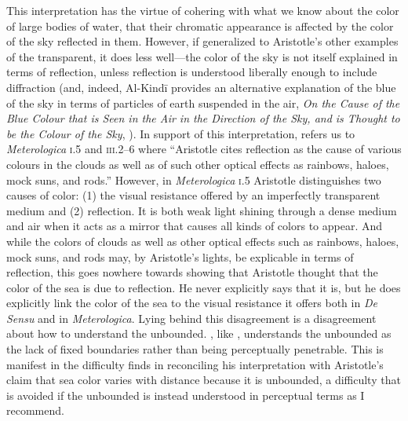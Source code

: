 This interpretation has the virtue of cohering with what we know about the color of large bodies of water, that their chromatic appearance is affected by the color of the sky reflected in them. However, if generalized to Aristotle's other examples of the transparent, it does less well---the color of the sky is not itself explained in terms of reflection, unless reflection is understood liberally enough to include diffraction (and, indeed, Al-Kind\={i} provides an alternative explanation of the blue of the sky in terms of particles of earth suspended in the air, \emph{On the Cause of the Blue Colour that is Seen in the Air in the Direction of the Sky, and is Thought to be the Colour of the Sky}, \citealt[139--143]{Adamson:2012fk}). In support of this interpretation, \citet[130]{Sorabji:2004fk} refers us to \emph{Meterologica} \textsc{i}.5 and \textsc{iii}.2--6 where ``Aristotle cites reflection as the cause of various colours in the clouds as well as of such other optical effects as rainbows, haloes, mock suns, and rods.'' However, in \emph{Meterologica} \textsc{i}.5 Aristotle distinguishes two causes of color: (1) the visual resistance offered by an imperfectly transparent medium and (2) reflection. It is both weak light shining through a dense medium and air when it acts as a mirror that causes all kinds of colors to appear. And while the colors of clouds as well as other optical effects such as rainbows, haloes, mock suns, and rods may, by Aristotle's lights, be explicable in terms of reflection, this goes nowhere towards showing that Aristotle thought that the color of the sea is due to reflection. He never explicitly says that it is, but he does explicitly link the color of the sea to the visual resistance it offers both in \emph{De Sensu} and in \emph{Meterologica}. Lying behind this disagreement is a disagreement about how to understand the unbounded. \citet{Sorabji:2004fk}, like \citet{Broackes:1999uq}, understands the unbounded as the lack of fixed boundaries rather than being perceptually penetrable. This is manifest in the difficulty \citet[131]{Sorabji:2004fk} finds in reconciling his interpretation with Aristotle's claim that sea color varies with distance because it is unbounded, a difficulty that is avoided if the unbounded is instead understood in perceptual terms as I recommend.


